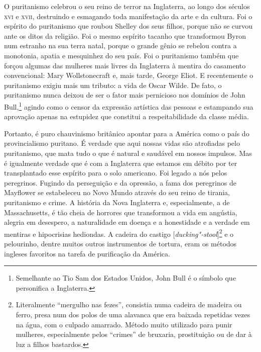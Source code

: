O puritanismo celebrou o seu reino de terror na Inglaterra, ao longo dos
séculos \textsc{xvi} e \textsc{xvii}, destruindo e esmagando toda manifestação da arte e
da cultura. Foi o espírito do puritanismo que roubou Shelley dos seus
filhos, porque não se curvou ante os ditos da religião. Foi o mesmo
espírito tacanho que transformou Byron num estranho na sua terra natal, porque
o grande gênio se rebelou contra a monotonia, apatia e mesquinhez do seu
país. Foi o puritanismo também que forçou algumas das mulheres mais
livres da Inglaterra à mentira do casamento convencional: Mary Wollstonecraft e,
mais tarde, George Eliot. E recentemente o puritanismo exigiu mais um
tributo: a vida de Oscar Wilde. De fato, o puritanismo nunca deixou de
ser o fator mais pernicioso nos domínios de John Bull,\footnote{Semelhante
  ao Tio Sam dos Estados Unidos, John Bull é o símbolo que personifica a
  Inglaterra.} agindo como o censor da expressão artística das pessoas e
estampando sua aprovação apenas na estupidez que constitui a
respeitabilidade da classe média.

Portanto, é puro chauvinismo britânico apontar para a América como o
país do provincialismo puritano. É verdade que aqui nossas vidas são
atrofiadas pelo puritanismo, que mata tudo o que é natural e saudável em
nossos impulsos. Mas é igualmente verdade que é com a Inglaterra
que estamos em débito por ter transplantado esse espírito para o solo
americano. Foi legado a nós pelos peregrinos. Fugindo da perseguição e
da opressão, a fama dos peregrinos de Mayflower se estabeleceu no Novo
Mundo através do seu reino de tirania, puritanismo e crime. A história
da Nova Inglaterra e, especialmente, a de Massachusetts, é tão cheia de
horrores que transformou a vida em angústia, alegria em desespero, a
naturalidade em doença e a honestidade e a verdade em mentiras e
hipocrisias hediondas. A cadeira do castigo
{[}\emph{ducking"-stool}{]}\footnote{Literalmente ``mergulho nas fezes'',
  consistia numa cadeira de madeira ou ferro, presa num dos polos de uma
  alavanca que era baixada repetidas vezes na água, com o culpado
  amarrado. Método muito utilizado para punir mulheres, especialmente
  pelos ``crimes'' de bruxaria, prostituição ou de dar à luz a filhos
  bastardos.} e o pelourinho, dentre muitos outros instrumentos de
tortura, eram os métodos ingleses favoritos na tarefa de purificação da
América.

